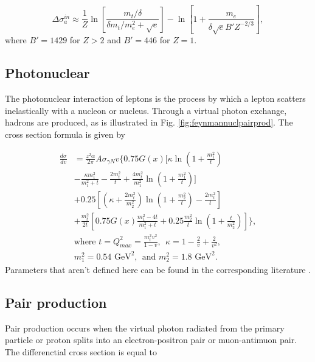 \begin{equation}
\Delta \sigma^{in}_a \approx \frac{1}{Z} \ln \left[ \frac{m_t/\delta}{\delta m_t/m_e^2 + \sqrt{e}} \right] - \ln\left[1+ \frac{m_e}{\delta \sqrt{e} B' Z^{-2/3}} \right],
\end{equation}
where $B'=1429$ for $Z > 2$ and $B' = 446$ for $Z=1$.
\subsection{Photonuclear}
The photonuclear interaction of leptons is the process by which a lepton scatters inelastically with a nucleon or nucleus. Through a virtual photon exchange, hadrons are produced, as is illustrated in Fig. \ref{fig:feynmannuclpairprod}. The cross section formula is given by

\begin{equation} 
\begin{split} 
\frac{d\sigma}{dv} &= \frac{z^2 \alpha}{2\pi} A \sigma_{\gamma N} v  \Bigg \lbrace  0.75 G(x) \Bigg [\kappa \ln \left(1+\frac{m_1^2}{t}\right) \\
& -\frac{\kappa m_1^2}{m_1^2 + t} - \frac{2 m_t^2}{t} + \frac{4 m_t^2}{m_1^2} \ln \left(1+ \frac{m_1^2}{t} \right)  \Bigg] \\
& + 0.25 \left[ \left(\kappa + \frac{2m_t^2}{m_2^2} \right) \ln \left(1+\frac{m_2^2}{t} \right) - \frac{2m_t^2}{t}\right]\\
& + \frac{m_t^2}{2t} \left[ 0.75 G(x) \frac{m_1^2 -4t}{m_1^2 +t} +0.25 \frac{m_2^2}{t} \ln \left(1+\frac{t}{m_2^2} \right) \right] \Bigg \rbrace,\\
& \textrm{where \ \ } t = Q_{max}^2 = \frac{m_t^2 v^2}{1-v}, \ \ \kappa = 1-\frac{2}{v} + \frac{2}{v^2}, \\
& m_1^2 = 0.54 \textrm{ GeV}^2, \ \ \textrm{and \ \ \ } m_2^2 = 1.8 \textrm{\ GeV}^2.
\end{split} 
\end{equation}
Parameters that aren't defined here can be found in the corresponding literature \cite{Chirkin:2004hz}.

\subsection{Pair production}
\label{subsec:pairprod}
Pair production occurs when the virtual photon radiated from the primary particle or proton splits into an electron-positron pair or muon-antimuon pair. The differenctial cross section is equal to
 

